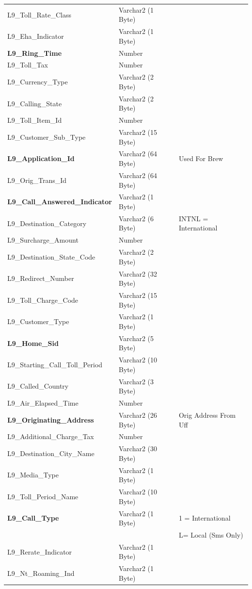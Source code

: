 \documentclass[12pt,twoside]{article}
\begin{document}
\begin{longtable}{l|l|l}
L9\_Toll\_Rate\_Class & Varchar2 (1 Byte) & \\
L9\_Eha\_Indicator & Varchar2 (1 Byte) & \\
\textbf{L9\_Ring\_Time} & Number & \\
L9\_Toll\_Tax & Number & \\
L9\_Currency\_Type & Varchar2 (2 Byte) & \\
L9\_Calling\_State & Varchar2 (2 Byte) & \\
L9\_Toll\_Item\_Id & Number & \\
L9\_Customer\_Sub\_Type & Varchar2 (15 Byte) & \\
\textbf{L9\_Application\_Id} & Varchar2 (64 Byte) & Used For Brew\\
L9\_Orig\_Trans\_Id & Varchar2 (64 Byte) & \\
\textbf{L9\_Call\_Answered\_Indicator} & Varchar2 (1 Byte) & \\
L9\_Destination\_Category & Varchar2 (6 Byte) & INTNL = International\\
L9\_Surcharge\_Amount & Number & \\
L9\_Destination\_State\_Code & Varchar2 (2 Byte) & \\
L9\_Redirect\_Number & Varchar2 (32 Byte) & \\
L9\_Toll\_Charge\_Code & Varchar2 (15 Byte) & \\
L9\_Customer\_Type & Varchar2 (1 Byte) & \\
\textbf{L9\_Home\_Sid} & Varchar2 (5 Byte) & \\
L9\_Starting\_Call\_Toll\_Period & Varchar2 (10 Byte) & \\
L9\_Called\_Country & Varchar2 (3 Byte) & \\
L9\_Air\_Elapsed\_Time & Number & \\
\textbf{L9\_Originating\_Address} & Varchar2 (26 Byte) & Orig Address From Uff\\
L9\_Additional\_Charge\_Tax & Number & \\
L9\_Destination\_City\_Name & Varchar2 (30 Byte) & \\
L9\_Media\_Type & Varchar2 (1 Byte) & \\
L9\_Toll\_Period\_Name & Varchar2 (10 Byte) & \\
\textbf{L9\_Call\_Type} & Varchar2 (1 Byte) & 1 = International\\
 &  & L= Local (Sms Only)\\
L9\_Rerate\_Indicator & Varchar2 (1 Byte) & \\
L9\_Nt\_Roaming\_Ind & Varchar2 (1 Byte) & \\

\end{longtable}
\end{document}
